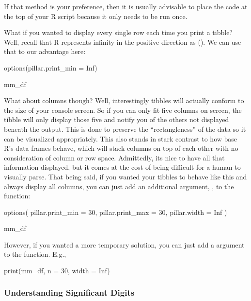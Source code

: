 \vspace{1em}

\noindent
If that method is your preference, then it is usually advisable to place the  code at the top of your R script because it only needs to be run once.

What if you wanted to display every single row each time you print a tibble? Well, recall that R represents infinity in the positive direction as (). We can use that to our advantage here:

\begin{inR}
options(pillar.print_min = Inf)

mm_df
\end{inR}

\vspace{1em}

What about columns though? Well, interestingly tibbles will actually conform to the size of your console screen.  So if you can only fit five columns on screen, the tibble will only display those five and notify you of the others not displayed beneath the output. This is done to preserve the ``rectangleness'' of the data so it can be visualized appropriately. This also stands in stark contrast to how base R's data frames behave, which will stack columns on top of each other with no consideration of column or row space. Admittedly, its nice to have all that information displayed, but it comes at the cost of being difficult for a human to visually parse. That being said, if you wanted your tibbles to behave like this and always display all columns, you can just add an additional argument, , to the  function:

\begin{inR}
options(
  pillar.print_min = 30,
  pillar.print_max = 30,
  pillar.width = Inf
)

mm_df
\end{inR}

\vspace{1em}

\noindent
However, if you wanted a more temporary solution, you can just add a  argument to the  function. E.g., 

\begin{inR}
print(mm_df, n = 30, width = Inf)
\end{inR}

\vspace{1em}

\subsubsection{Understanding Significant Digits}
\label{sec:sig_digs}


